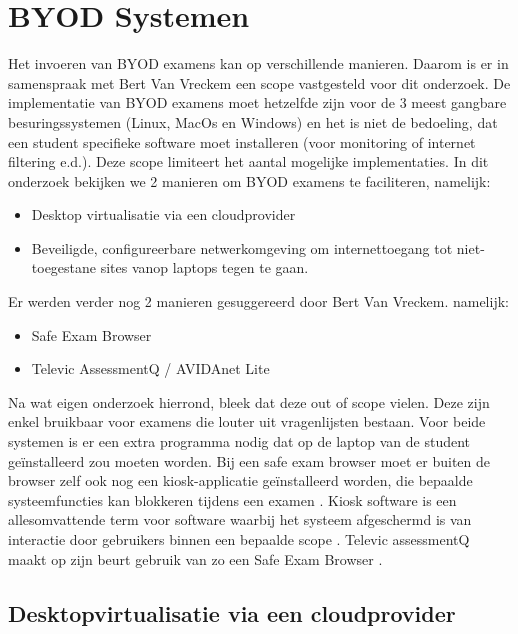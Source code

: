     
\section{BYOD Systemen}

Het invoeren van BYOD examens kan op verschillende manieren. Daarom is er in samenspraak met Bert Van Vreckem een scope vastgesteld voor dit onderzoek. De implementatie van BYOD examens moet hetzelfde zijn voor de 3 meest gangbare besuringssystemen (Linux, MacOs en Windows) en het is niet de bedoeling, dat een student specifieke software moet installeren (voor monitoring of internet filtering e.d.). Deze scope limiteert het aantal mogelijke implementaties. In dit onderzoek bekijken we 2 manieren om BYOD examens te faciliteren, namelijk:

\begin{itemize} 
\item Desktop virtualisatie via een cloudprovider
\item Beveiligde, configureerbare netwerkomgeving om internettoegang tot niet-toegestane sites vanop laptops tegen te gaan.	
\end{itemize}

Er werden verder nog 2 manieren gesuggereerd door Bert Van Vreckem. namelijk:  
\begin{itemize}
	\item Safe Exam Browser 
	\item Televic AssessmentQ / AVIDAnet Lite
\end{itemize}

Na wat eigen onderzoek hierrond, bleek dat deze out of scope vielen. Deze zijn enkel bruikbaar voor examens die louter uit vragenlijsten bestaan. Voor beide systemen is er een extra programma nodig dat op de laptop van de student ge\"{i}nstalleerd zou moeten worden. Bij een safe exam browser moet er buiten de browser zelf ook nog een kiosk-applicatie ge\"{i}nstalleerd worden, die bepaalde systeemfuncties kan blokkeren tijdens een examen \autocite{SEB2019}. Kiosk software is een allesomvattende term voor software waarbij het systeem afgeschermd is van interactie door gebruikers binnen een bepaalde scope \autocite{Kio2009}. Televic assessmentQ maakt op zijn beurt gebruik van zo een Safe Exam Browser \autocite{Tele2019}. 

\subsection{Desktopvirtualisatie via een cloudprovider}

